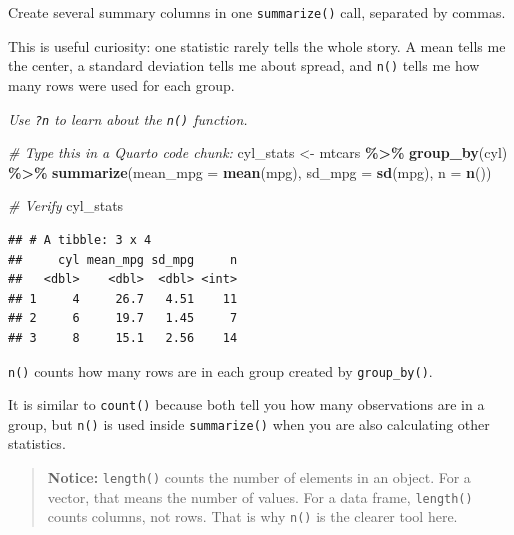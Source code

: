 \documentclass[
]{article}
\newenvironment{Shaded}{\begin{snugshade}}{\end{snugshade}}
\newcommand{\AttributeTok}[1]{\textcolor[rgb]{0.13,0.29,0.53}{#1}}
\newcommand{\CommentTok}[1]{\textcolor[rgb]{0.56,0.35,0.01}{\textit{#1}}}
\newcommand{\FunctionTok}[1]{\textcolor[rgb]{0.13,0.29,0.53}{\textbf{#1}}}
\newcommand{\NormalTok}[1]{#1}
\newcommand{\OtherTok}[1]{\textcolor[rgb]{0.56,0.35,0.01}{#1}}
\newcommand{\SpecialCharTok}[1]{\textcolor[rgb]{0.81,0.36,0.00}{\textbf{#1}}}
\begin{document}
Create several summary columns in one \texttt{summarize()} call,
separated by commas.

This is useful curiosity: one statistic rarely tells the whole story. A
mean tells me the center, a standard deviation tells me about spread,
and \texttt{n()} tells me how many rows were used for each group.

\emph{Use \texttt{?n} to learn about the \texttt{n()} function.}

\begin{Shaded}
\begin{Highlighting}[]
\CommentTok{\#  Type this in a Quarto code chunk:}
\NormalTok{cyl\_stats }\OtherTok{\textless{}{-}}\NormalTok{ mtcars }\SpecialCharTok{\%\textgreater{}\%}
  \FunctionTok{group\_by}\NormalTok{(cyl) }\SpecialCharTok{\%\textgreater{}\%}
  \FunctionTok{summarize}\NormalTok{(}\AttributeTok{mean\_mpg =} \FunctionTok{mean}\NormalTok{(mpg),}
            \AttributeTok{sd\_mpg   =} \FunctionTok{sd}\NormalTok{(mpg),}
            \AttributeTok{n        =} \FunctionTok{n}\NormalTok{())}
\end{Highlighting}
\end{Shaded}

\begin{Shaded}
\begin{Highlighting}[]
\CommentTok{\#  Verify}
\NormalTok{cyl\_stats}
\end{Highlighting}
\end{Shaded}

\begin{verbatim}
## # A tibble: 3 x 4
##     cyl mean_mpg sd_mpg     n
##   <dbl>    <dbl>  <dbl> <int>
## 1     4     26.7   4.51    11
## 2     6     19.7   1.45     7
## 3     8     15.1   2.56    14
\end{verbatim}

\texttt{n()} counts how many rows are in each group created by
\texttt{group\_by()}.

It is similar to \texttt{count()} because both tell you how many
observations are in a group, but \texttt{n()} is used inside
\texttt{summarize()} when you are also calculating other statistics.

\begin{quote}
\textbf{Notice:} \texttt{length()} counts the number of elements in an
object. For a vector, that means the number of values. For a data frame,
\texttt{length()} counts columns, not rows. That is why \texttt{n()} is
the clearer tool here.
\end{quote}
\end{document}
